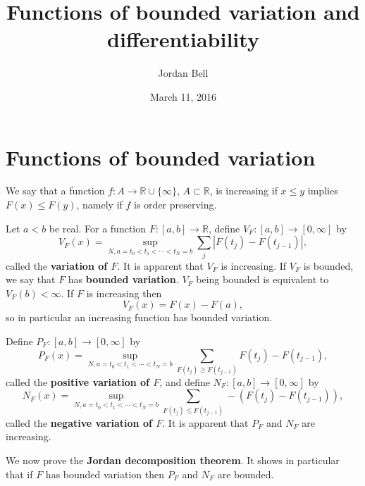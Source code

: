 \documentclass{article}
\theoremstyle{definition}
\theoremstyle{definition}
\begin{document}
\title{Functions of bounded variation and differentiability}
\author{Jordan Bell}
\date{March 11, 2016}

\maketitle

\section{Functions of bounded variation}
We say that a function $f:A \to \mathbb{R} \cup \{\infty\}$, $A \subset \mathbb{R}$,
is 
increasing if $x \leq y$ implies $F(x) \leq F(y)$, namely if $f$ is order preserving. 

Let $a<b$ be real. For a function $F:[a,b] \to \mathbb{R}$, define $V_F:[a,b] \to [0,\infty]$ by
\[
V_F(x) = \sup_{N, a=t_0<t_1<\cdots<t_N=b} \sum_j |F(t_j)-F(t_{j-1})|,
\]
called the \textbf{variation of $F$}.
It is apparent that $V_F$ is increasing. If $V_F$ is bounded, we say that $F$ has \textbf{bounded variation}.  $V_F$
being bounded is equivalent to $V_F(b)<\infty$. If $F$ is increasing then
\[
V_F(x) = F(x)-F(a),
\]
so in particular an increasing function has bounded variation.


Define $P_F:[a,b] \to [0,\infty]$ by
\[
P_F(x) = \sup_{N, a=t_0<t_1<\cdots<t_N=b} \sum_{F(t_j) \geq F(t_{j-1})} F(t_j)-F(t_{j-1}),
\]
called the \textbf{positive variation of $F$}, and define
$N_F:[a,b] \to [0,\infty]$ by
\[
N_F(x) = \sup_{N, a=t_0<t_1<\cdots<t_N=b} \sum_{F(t_j) \leq F(t_{j-1})} -(F(t_j)-F(t_{j-1})),
\]
called the \textbf{negative variation of $F$}. It is apparent that $P_F$ and $N_F$ are increasing.

We now prove the \textbf{Jordan decomposition theorem}. It shows in particular that if $F$ has bounded variation then
$P_F$ and $N_F$ are bounded.
\end{document}
